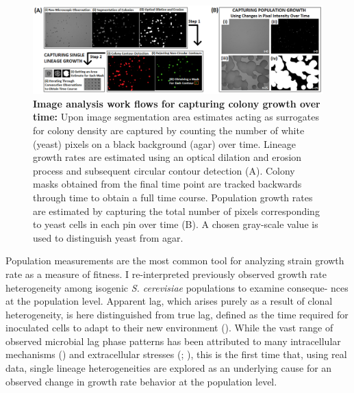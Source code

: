 \documentclass{bioinfo}
\begin{document}
\setcounter{figure}{11}
\begin{figure}[hb!]
\centering
\includegraphics[width=1\linewidth]{Ch2ImageAnalysis.png}
\vspace{-2em}
\caption{\textbf{Image analysis work flows for capturing colony growth over time:} Upon image segmentation area estimates acting as surrogates for colony density are captured by counting the number of white (yeast) pixels on a black background (agar) over time. Lineage growth rates are estimated using an optical dilation and erosion process and subsequent circular contour detection (A). Colony masks obtained from the final time point are tracked backwards through time to obtain a full time course. Population growth rates are estimated by capturing the total number of pixels corresponding to yeast cells in each pin over time (B). A chosen gray-scale value is used to distinguish yeast from agar.}
\label{fig:ImageAnalysis}
\vspace{-2em}
\end{figure}

Population measurements are the most common tool for analyzing strain growth rate as a measure of fitness. I re-interpreted previously observed growth rate heterogeneity among isogenic \textit{S. cerevisiae} populations to examine conseque- nces at the population level. Apparent lag, which arises purely as a result of clonal heterogeneity, is here distinguished from true lag, defined as the time required for inoculated cells to adapt to their new environment (\citealp{Rolfe11}). 
While the vast range of observed microbial lag phase patterns has been attributed to many intracellular mechanisms (\citealp{Rolfe11}) and extracellular stresses (\citealp{Baranyi98}; \citealp{Fridman14}), this is the first time that, using real data, single lineage heterogeneities are explored as an underlying cause for an observed change in growth rate behavior at the population level. 
\end{document}
